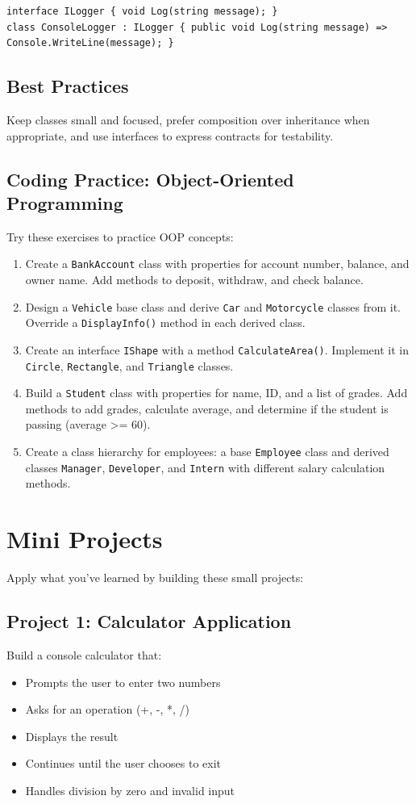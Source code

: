 \documentclass{article}
\begin{document}
\begin{verbatim}
interface ILogger { void Log(string message); }
class ConsoleLogger : ILogger { public void Log(string message) => Console.WriteLine(message); }
\end{verbatim}

\subsection{Best Practices}
Keep classes small and focused, prefer composition over inheritance when appropriate, and use interfaces to express contracts for testability.

\subsection{Coding Practice: Object-Oriented Programming}
Try these exercises to practice OOP concepts:

\begin{enumerate}
    \item Create a \texttt{BankAccount} class with properties for account number, balance, and owner name. Add methods to deposit, withdraw, and check balance.
    \item Design a \texttt{Vehicle} base class and derive \texttt{Car} and \texttt{Motorcycle} classes from it. Override a \texttt{DisplayInfo()} method in each derived class.
    \item Create an interface \texttt{IShape} with a method \texttt{CalculateArea()}. Implement it in \texttt{Circle}, \texttt{Rectangle}, and \texttt{Triangle} classes.
    \item Build a \texttt{Student} class with properties for name, ID, and a list of grades. Add methods to add grades, calculate average, and determine if the student is passing (average >= 60).
    \item Create a class hierarchy for employees: a base \texttt{Employee} class and derived classes \texttt{Manager}, \texttt{Developer}, and \texttt{Intern} with different salary calculation methods.
\end{enumerate}

\section{Mini Projects}
Apply what you've learned by building these small projects:

\subsection{Project 1: Calculator Application}
Build a console calculator that:
\begin{itemize}
    \item Prompts the user to enter two numbers
    \item Asks for an operation (+, -, *, /)
    \item Displays the result
    \item Continues until the user chooses to exit
    \item Handles division by zero and invalid input
\end{itemize}
\end{document}
